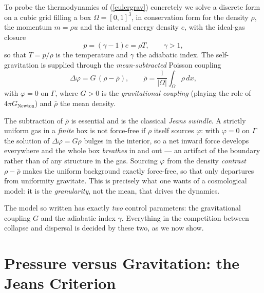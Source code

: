 To probe the thermodynamics of (\ref{eulergrav}) concretely we solve a
discrete form on a cubic grid filling a box $\Omega =[0,1]^3$, in conservation
form for the density $\rho$, the momentum $m=\rho u$ and the internal energy
density $e$, with the ideal-gas closure
\begin{equation}\label{closure}
p=(\gamma -1)e=\rho T,\qquad \gamma >1,
\end{equation}
so that $T=p/\rho$ is the temperature and $\gamma$ the adiabatic index. The
self-gravitation is supplied through the \emph{mean-subtracted} Poisson coupling
\begin{equation}\label{jeansswindle}
\Delta\varphi = G\,(\rho -\bar\rho ),\qquad
\bar\rho =\frac{1}{\vert\Omega\vert}\int_\Omega\rho\, dx,
\end{equation}
with $\varphi =0$ on $\Gamma$, where $G>0$ is the \emph{gravitational coupling}
(playing the role of $4\pi G_{\mathrm{Newton}}$) and $\bar\rho$ the mean density.

The subtraction of $\bar\rho$ is essential and is the classical
\emph{Jeans swindle}. A strictly uniform gas in a \emph{finite} box is not
force-free if $\rho$ itself sources $\varphi$: with $\varphi =0$ on $\Gamma$ the
solution of $\Delta\varphi =G\rho$ bulges in the interior, so a net inward force
develops everywhere and the whole box \emph{breathes} in and out --- an artifact
of the boundary rather than of any structure in the gas. Sourcing $\varphi$ from
the density \emph{contrast} $\rho -\bar\rho$ makes the uniform background exactly
force-free, so that only departures from uniformity gravitate. This is precisely
what one wants of a cosmological model: it is the \emph{granularity}, not the
mean, that drives the dynamics.

The model so written has exactly \emph{two} control parameters: the
gravitational coupling $G$ and the adiabatic index $\gamma$. Everything in the
competition between collapse and dispersal is decided by these two, as we now
show.

\section{Pressure versus Gravitation: the Jeans Criterion}

